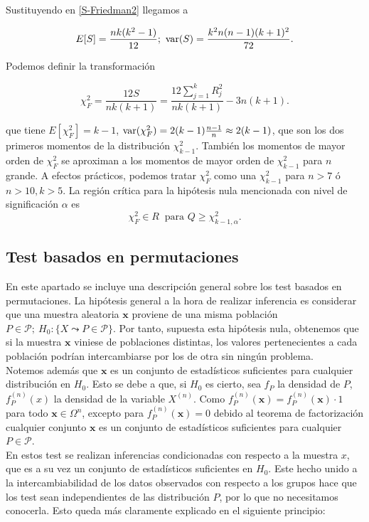 	Sustituyendo en \ref{S-Friedman2} llegamos a 
	
	\[ E[S] = \frac{nk(k^2-1)}{12}; \ 
		\var(S)= \frac{k^2n(n-1)(k+1)^2}{72} .\]
	
	Podemos definir la transformación
	
	\[ \chi^2_F = \frac{12S}{nk(k+1)} = 
	\frac{12 \sum\limits_{j=1}^k R_j^2}{nk(k+1)} -3n(k+1) .
	\]
	
	que tiene $E[\chi^2_F] = k-1$, $\text{var}(\chi^2_F)= 2(k-1)\frac{n-1}{n} \approx 2(k-1)$, que son los dos primeros momentos de la distribución $\chi^2_{k-1}$. También los momentos de mayor orden de $\chi^2_F$ se aproximan a los momentos de mayor orden de $\chi^2_{k-1}$ para $n$ grande. A efectos prácticos, podemos tratar $\chi^2_F$ como una $\chi^2_{k-1}$ para $n>7$ ó $n>10, k>5$. La región crítica para la hipótesis nula mencionada con nivel de significación $\alpha$ es
	\[ \chi^2_F \in R \ \text{ para } Q \geq \chi_{k-1,\alpha}^2 .\]
	
\subsection{Test basados en permutaciones}
	
	En este apartado se incluye una descripción general sobre los test basados en permutaciones. La hipótesis general a la hora de realizar inferencia es considerar que una muestra aleatoria $\mathbf{x}$ proviene de una misma población $ P \in \mathcal{P};\ H_0: \{ X \leadsto P \in \mathcal{P} \}$. Por tanto, supuesta esta hipótesis nula, obtenemos que si la muestra $\mathbf{x}$ viniese de poblaciones distintas, los valores pertenecientes a cada población podrían intercambiarse por los de otra sin ningún problema.\\
	Notemos además que $\mathbf{x}$ es un conjunto de estadísticos suficientes para cualquier distribución en $H_0$. Esto se debe a que, si $H_0$ es cierto, sea $f_P$ la densidad de $P$, $f_P^{(n)}(x)$ la densidad de la variable $X^(n)$. Como $f_P^{(n)}(\mathbf{x}) = f_P^{(n)}(\mathbf{x}) \cdot 1$ para todo $\mathbf{x} \in \Omega^n$, excepto para $f_P^{(n)}(\mathbf{x}) = 0$ debido al teorema de factorización cualquier conjunto $\mathbf{x}$ es un conjunto de estadísticos suficientes para cualquier $P \in \mathcal{P}$.\\
	En estos test se realizan inferencias condicionadas con respecto a la muestra $x$, que es a su vez un conjunto de estadísticos suficientes en $H_0$. Este hecho unido a la intercambiabilidad de los datos observados con respecto a los grupos hace que los test sean independientes de las distribución $P$, por lo que no necesitamos conocerla. Esto queda más claramente explicado en el siguiente principio:

